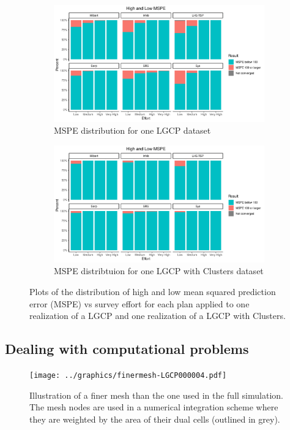 \documentclass[review]{elsarticle}
\begin{document}
\begin{figure}

\begin{subfigure}{4.5in}
\includegraphics[width=4.5in]{../graphics/HighMSPE-LGCP000004.png}
\caption{MSPE distribution for one LGCP dataset}
\label{highmspelgcp}
\end{subfigure}

\begin{subfigure}{4.5in}
\includegraphics[width=4.5in]{../graphics/HighMSPE-Cluster000004.png}
\caption{MSPE distribtuion for one LGCP with Clusters dataset}
\label{highmspecluster}
\end{subfigure}

\caption{Plots of the distribution of high and low mean squared prediction
error (MSPE) vs survey effort for each plan applied to one realization of a
LGCP and one realization of a LGCP with Clusters.}
\label{histmsperesults}
\end{figure}

\subsection{Dealing with computational problems}

\begin{figure}
\texttt{[image: ../graphics/finermesh-LGCP000004.pdf]}
\caption{Illustration of a finer mesh than the one used in the full simulation.
The mesh nodes are used in a numerical integration scheme where they are
weighted by the area of their dual cells (outlined in grey).}
\label{meshfiner}
\end{figure}
\end{document}
